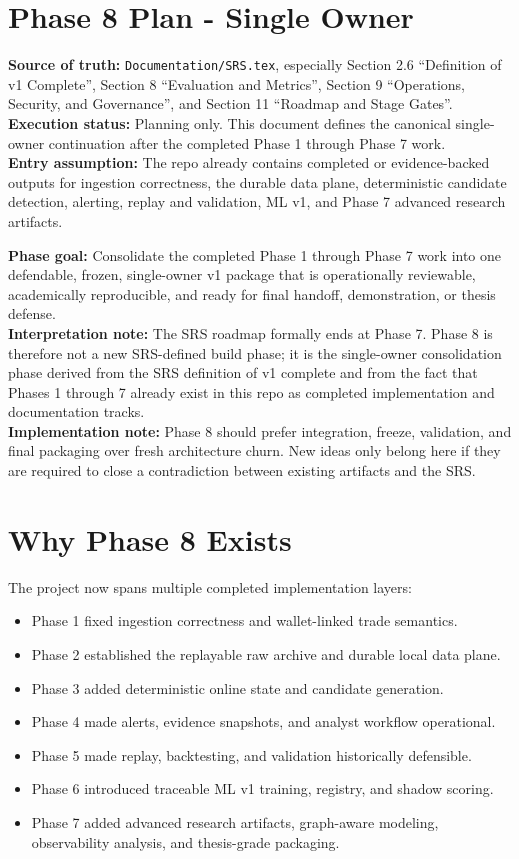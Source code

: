 \documentclass{article}
\begin{document}
\section*{Phase 8 Plan - Single Owner}

\textbf{Source of truth:} \texttt{Documentation/SRS.tex}, especially Section 2.6 ``Definition of v1 Complete'', Section 8 ``Evaluation and Metrics'', Section 9 ``Operations, Security, and Governance'', and Section 11 ``Roadmap and Stage Gates''.\\
\textbf{Execution status:} Planning only. This document defines the canonical single-owner continuation after the completed Phase 1 through Phase 7 work.\\
\textbf{Entry assumption:} The repo already contains completed or evidence-backed outputs for ingestion correctness, the durable data plane, deterministic candidate detection, alerting, replay and validation, ML v1, and Phase 7 advanced research artifacts.

\textbf{Phase goal:} Consolidate the completed Phase 1 through Phase 7 work into one defendable, frozen, single-owner v1 package that is operationally reviewable, academically reproducible, and ready for final handoff, demonstration, or thesis defense.\\
\textbf{Interpretation note:} The SRS roadmap formally ends at Phase 7. Phase 8 is therefore not a new SRS-defined build phase; it is the single-owner consolidation phase derived from the SRS definition of v1 complete and from the fact that Phases 1 through 7 already exist in this repo as completed implementation and documentation tracks.\\
\textbf{Implementation note:} Phase 8 should prefer integration, freeze, validation, and final packaging over fresh architecture churn. New ideas only belong here if they are required to close a contradiction between existing artifacts and the SRS.

\section*{Why Phase 8 Exists}
The project now spans multiple completed implementation layers:
\begin{itemize}
\item Phase 1 fixed ingestion correctness and wallet-linked trade semantics.
\item Phase 2 established the replayable raw archive and durable local data plane.
\item Phase 3 added deterministic online state and candidate generation.
\item Phase 4 made alerts, evidence snapshots, and analyst workflow operational.
\item Phase 5 made replay, backtesting, and validation historically defensible.
\item Phase 6 introduced traceable ML v1 training, registry, and shadow scoring.
\item Phase 7 added advanced research artifacts, graph-aware modeling, observability analysis, and thesis-grade packaging.
\end{itemize}
\end{document}
